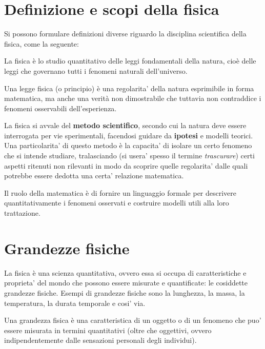 \marginpar{\minitoc}

\section{Definizione e scopi della fisica}

Si possono formulare definizioni diverse riguardo la disciplina scientifica
della fisica, come la seguente:

\vspace{8pt}
\begin{tcolorbox}[colback = yellow!30, colframe = yellow!30!black, title = {Fisica}]
La fisica è lo studio quantitativo delle leggi fondamentali della natura, cioè
delle leggi che governano tutti i fenomeni naturali dell'universo.

Una legge fisica (o principio) è una regolarita' della natura esprimibile in forma
matematica, ma anche una verità non dimostrabile che tuttavia non contraddice i
fenomeni osservabili dell'esperienza.
\end{tcolorbox}
\vspace{5pt}

La fisica si avvale del \textbf{metodo scientifico}, secondo cui la natura deve
essere interrogata per vie sperimentali, facendosi guidare da \textbf{ipotesi} e
modelli teorici. Una particolarita' di questo metodo è la capacita' di isolare
un certo fenomeno che si intende studiare, tralasciando (si usera' spesso il
termine \textit{trascurare}) certi aspetti ritenuti non rilevanti in modo da
scoprire quelle regolarita' dalle quali potrebbe essere dedotta una certa'
relazione matematica.

Il ruolo della matematica è di fornire un linguaggio formale per descrivere
quantitativamente i fenomeni osservati e costruire modelli utili alla loro
trattazione.



\section{Grandezze fisiche}
La fisica è una scienza quantitativa, ovvero essa si occupa di caratteristiche
e proprieta' del mondo che possono essere misurate e quantificate: le cosiddette
grandezze fisiche. Esempi di grandezze fisiche sono la lunghezza, la massa, la
temperatura, la durata temporale e cosi' via.

\vspace{8pt}
\begin{tcolorbox}[colback = yellow!30, colframe = yellow!30!black, title = {Grandezza fisica}]
Una grandezza fisica è una caratteristica di un oggetto o di un fenomeno che puo'
essere misurata in termini quantitativi (oltre che oggettivi, ovvero indipendentemente
dalle sensazioni personali degli individui).
\end{tcolorbox}
\vspace{5pt}


